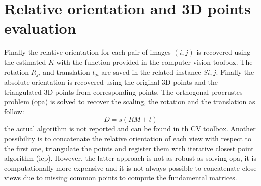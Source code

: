 \documentclass[12pt]{article}
\begin{document}
\section{Relative orientation and 3D points evaluation}
Finally the relative orientation for each pair of images $(i,j)$ is recovered using the estimated $K$ with the function provided in the computer vision toolbox. The rotation $R_{ji}$ and translation $t_{ji}$ are saved in the related instance $S{i,j}$. Finally the absolute orientation is recovered using the original 3D points and the triangulated 3D points from corresponding points. The orthogonal procrustes problem (opa) is solved to recover the scaling, the rotation and the translation as follow:
\begin{equation}
    D=s(RM+t)
\end{equation}
the actual algorithm is not reported and can be found in th CV toolbox. Another possibility is to concatenate the relative orientation of each view with respect to the first one, triangulate the points and register them with iterative closest point algorithm (icp). However, the latter approach is not as robust as solving opa, it is computationally more expensive and it is not always possible to concatenate close views due to missing common points to compute the fundamental matrices.
\end{document}
